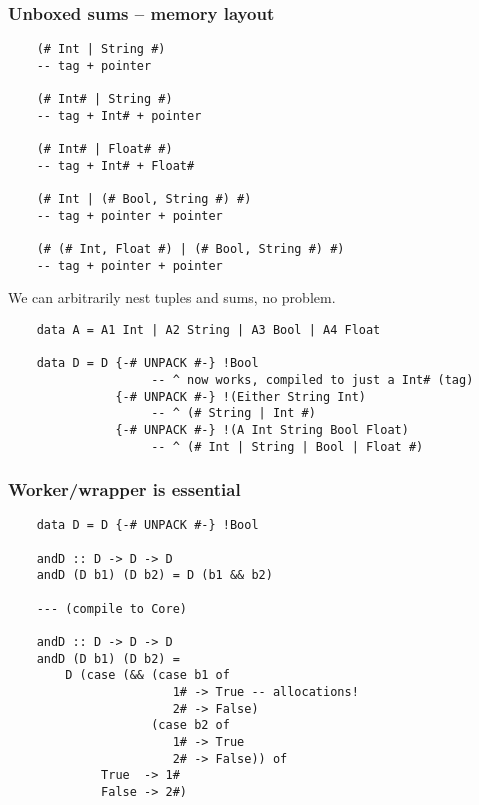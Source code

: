 \documentclass{beamer}
\begin{document}
\begin{frame}[fragile]
    \frametitle{Unboxed sums -- memory layout}

    \begin{verbatim}
    (# Int | String #)
    -- tag + pointer

    (# Int# | String #)
    -- tag + Int# + pointer

    (# Int# | Float# #)
    -- tag + Int# + Float#

    (# Int | (# Bool, String #) #)
    -- tag + pointer + pointer

    (# (# Int, Float #) | (# Bool, String #) #)
    -- tag + pointer + pointer
    \end{verbatim}

    We can arbitrarily nest tuples and sums, no problem.
\end{frame}

\begin{frame}[fragile]
    \begin{verbatim}
    data A = A1 Int | A2 String | A3 Bool | A4 Float

    data D = D {-# UNPACK #-} !Bool
                    -- ^ now works, compiled to just a Int# (tag)
               {-# UNPACK #-} !(Either String Int)
                    -- ^ (# String | Int #)
               {-# UNPACK #-} !(A Int String Bool Float)
                    -- ^ (# Int | String | Bool | Float #)
    \end{verbatim}
\end{frame}

\begin{frame}[fragile]
    \frametitle{Worker/wrapper is essential}

    \begin{verbatim}
    data D = D {-# UNPACK #-} !Bool

    andD :: D -> D -> D
    andD (D b1) (D b2) = D (b1 && b2)

    --- (compile to Core)

    andD :: D -> D -> D
    andD (D b1) (D b2) =
        D (case (&& (case b1 of
                       1# -> True -- allocations!
                       2# -> False)
                    (case b2 of
                       1# -> True
                       2# -> False)) of
             True  -> 1#
             False -> 2#)
    \end{verbatim}
\end{frame}
\end{document}
